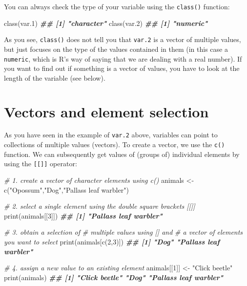 \documentclass[
]{book}
\newenvironment{Shaded}{\begin{snugshade}}{\end{snugshade}}
\newcommand{\CommentTok}[1]{\textcolor[rgb]{0.56,0.35,0.01}{\textit{#1}}}
\newcommand{\DecValTok}[1]{\textcolor[rgb]{0.00,0.00,0.81}{#1}}
\newcommand{\DocumentationTok}[1]{\textcolor[rgb]{0.56,0.35,0.01}{\textbf{\textit{#1}}}}
\newcommand{\FloatTok}[1]{\textcolor[rgb]{0.00,0.00,0.81}{#1}}
\newcommand{\FunctionTok}[1]{\textcolor[rgb]{0.00,0.00,0.00}{#1}}
\newcommand{\NormalTok}[1]{#1}
\newcommand{\OtherTok}[1]{\textcolor[rgb]{0.56,0.35,0.01}{#1}}
\newcommand{\StringTok}[1]{\textcolor[rgb]{0.31,0.60,0.02}{#1}}
\begin{document}
You can always check the type of your variable using the \texttt{class()} function:

\begin{Shaded}
\begin{Highlighting}[]
\FunctionTok{class}\NormalTok{(var}\FloatTok{.1}\NormalTok{)}
\DocumentationTok{\#\# [1] "character"}
\FunctionTok{class}\NormalTok{(var}\FloatTok{.2}\NormalTok{)}
\DocumentationTok{\#\# [1] "numeric"}
\end{Highlighting}
\end{Shaded}

As you see, \texttt{class()} does not tell you that \texttt{var.2} is a vector of multiple values, but just focuses on the type of the values contained in them (in this case a \texttt{numeric}, which is R's way of saying that we are dealing with a real number). If you want to find out if something is a vector of values, you have to look at the length of the variable (see below).

\hypertarget{vectors-and-element-selection}{%
\section{Vectors and element selection}\label{vectors-and-element-selection}}

As you have seen in the example of \texttt{var.2} above, variables can point to collections of multiple values (vectors). To create a vector, we use the \texttt{c()} function. We can subsequently get values of (groups of) individual elements by using the \texttt{{[}{[}{]}{]}} operator:

\begin{Shaded}
\begin{Highlighting}[]
\CommentTok{\# 1. create a vector of character elements using c()}
\NormalTok{animals }\OtherTok{\textless{}{-}} \FunctionTok{c}\NormalTok{(}\StringTok{"Opossum"}\NormalTok{,}\StringTok{"Dog"}\NormalTok{,}\StringTok{"Pallas\textquotesingle{}s leaf warbler"}\NormalTok{)}

\CommentTok{\# 2. select a single element using the double square brackets [[]]}
\FunctionTok{print}\NormalTok{(animals[[}\DecValTok{3}\NormalTok{]])}
\DocumentationTok{\#\# [1] "Pallas\textquotesingle{}s leaf warbler"}


\CommentTok{\# 3. obtain a selection of }
\CommentTok{\# multiple values using [] and}
\CommentTok{\# a vector of elements you want to select}
\FunctionTok{print}\NormalTok{(animals[}\FunctionTok{c}\NormalTok{(}\DecValTok{2}\NormalTok{,}\DecValTok{3}\NormalTok{)])}
\DocumentationTok{\#\# [1] "Dog"                   "Pallas\textquotesingle{}s leaf warbler"}


\CommentTok{\# 4. assign a new value to an existing element}
\NormalTok{animals[[}\DecValTok{1}\NormalTok{]] }\OtherTok{\textless{}{-}} \StringTok{"Click beetle"}
\FunctionTok{print}\NormalTok{(animals)}
\DocumentationTok{\#\# [1] "Click beetle"          "Dog"                   "Pallas\textquotesingle{}s leaf warbler"}
\end{Highlighting}
\end{Shaded}
\end{document}
